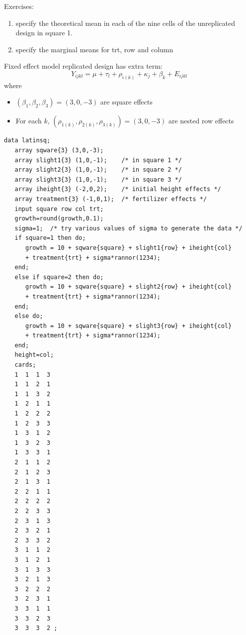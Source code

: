 Exercises: 
\begin{enumerate}
\item specify the theoretical mean in each of the nine cells of the
unreplicated design in square 1.
\item specify the marginal means for trt, row and column
\end{enumerate}

\vspace{0.2in}

\noindent
Fixed effect model replicated design has extra term:
$$ Y_{ijkl} = \mu + \tau_l + \rho_{i(k)} + \kappa_j + \beta_k + E_{ijkl}$$
where
\begin{itemize}
\item $(\beta_1,\beta_2,\beta_3)=(3,0,-3)$ are square effects
\item For each $k$, $(\rho_{1(k)},\rho_{2(k)},\rho_{3(k)})=(3,0,-3)$ are nested row effects
\end{itemize}
\newpage
\begin{small}
\begin{verbatim}
data latinsq;
   array sqware{3} (3,0,-3);
   array slight1{3} (1,0,-1);    /* in square 1 */
   array slight2{3} (1,0,-1);    /* in square 2 */
   array slight3{3} (1,0,-1);    /* in square 3 */
   array iheight{3} (-2,0,2);    /* initial height effects */
   array treatment{3} (-1,0,1);  /* fertilizer effects */
   input square row col trt; 
   growth=round(growth,0.1);
   sigma=1;  /* try various values of sigma to generate the data */
   if square=1 then do;
      growth = 10 + sqware{square} + slight1{row} + iheight{col}
      + treatment{trt} + sigma*rannor(1234);
   end;
   else if square=2 then do;
      growth = 10 + sqware{square} + slight2{row} + iheight{col}
      + treatment{trt} + sigma*rannor(1234);
   end;
   else do;
      growth = 10 + sqware{square} + slight3{row} + iheight{col}
      + treatment{trt} + sigma*rannor(1234);
   end;
   height=col;
   cards;
   1  1  1  3  
   1  1  2  1 
   1  1  3  2
   1  2  1  1  
   1  2  2  2 
   1  2  3  3
   1  3  1  2  
   1  3  2  3 
   1  3  3  1
   2  1  1  2  
   2  1  2  3 
   2  1  3  1
   2  2  1  1  
   2  2  2  2 
   2  2  3  3
   2  3  1  3  
   2  3  2  1
   2  3  3  2
   3  1  1  2  
   3  1  2  1
   3  1  3  3
   3  2  1  3  
   3  2  2  2 
   3  2  3  1
   3  3  1  1  
   3  3  2  3
   3  3  3  2 ;
\end{verbatim}
\end{small}
\newpage
